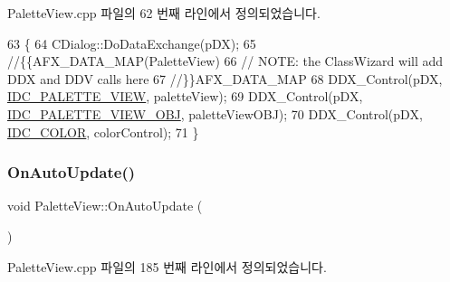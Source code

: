 Palette\+View.\+cpp 파일의 62 번째 라인에서 정의되었습니다.


\begin{DoxyCode}
63 \{
64   CDialog::DoDataExchange(pDX);
65   \textcolor{comment}{//\{\{AFX\_DATA\_MAP(PaletteView)}
66   \textcolor{comment}{// NOTE: the ClassWizard will add DDX and DDV calls here}
67   \textcolor{comment}{//\}\}AFX\_DATA\_MAP}
68   DDX\_Control(pDX, \mbox{\hyperlink{resource_8h_a83b3979e02a9d3d4bcdc682ce19c1007}{IDC\_PALETTE\_VIEW}}, paletteView);
69   DDX\_Control(pDX, \mbox{\hyperlink{resource_8h_aa5e92cc3af1dc7e3cd943299585772a6}{IDC\_PALETTE\_VIEW\_OBJ}}, paletteViewOBJ);
70   DDX\_Control(pDX, \mbox{\hyperlink{resource_8h_a611975b03b6d7ce68b2de260b97086d0}{IDC\_COLOR}}, colorControl);
71 \}
\end{DoxyCode}
\mbox{\label{class_palette_view_a4308e6a50e6b4870432bcb90c03f3c91}} 
\subsubsection{\texorpdfstring{On\+Auto\+Update()}{OnAutoUpdate()}}
{\footnotesize\ttfamily void Palette\+View\+::\+On\+Auto\+Update (\begin{DoxyParamCaption}{ }\end{DoxyParamCaption})\hspace{0.3cm}{\ttfamily [protected]}}



Palette\+View.\+cpp 파일의 185 번째 라인에서 정의되었습니다.


